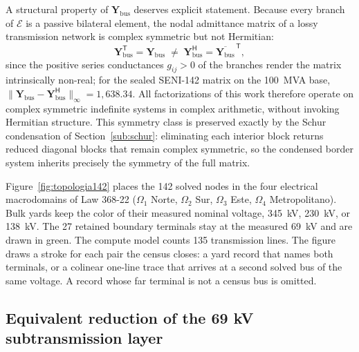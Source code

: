 A structural property of $\mathbf{Y}_{\mathrm{bus}}$ deserves explicit statement. Because every branch of $\mathcal{E}$ is a passive bilateral element, the nodal admittance matrix of a lossy transmission network is complex symmetric but not Hermitian:
\begin{equation}
\mathbf{Y}_{\mathrm{bus}}^{\mathsf{T}} = \mathbf{Y}_{\mathrm{bus}} \;\ne\; \mathbf{Y}_{\mathrm{bus}}^{\mathsf{H}} = \overline{\mathbf{Y}_{\mathrm{bus}}}^{\,\mathsf{T}},
\label{eq:nonhermitian}
\end{equation}
since the positive series conductances $g_{ij} > 0$ of the branches render the matrix intrinsically non-real; for the sealed SENI-142 matrix on the 100~MVA base, $\|\mathbf{Y}_{\mathrm{bus}} - \mathbf{Y}_{\mathrm{bus}}^{\mathsf{H}}\|_{\infty} = 1{,}638.34$. All factorizations of this work therefore operate on complex symmetric indefinite systems in complex arithmetic, without invoking Hermitian structure. This symmetry class is preserved exactly by the Schur condensation of Section~\ref{sub:schur}: eliminating each interior block returns reduced diagonal blocks that remain complex symmetric, so the condensed border system inherits precisely the symmetry of the full matrix.

Figure~\ref{fig:topologia142} places the 142 solved nodes in the four electrical macrodomains of Law 368-22 ($\Omega_1$ Norte, $\Omega_2$ Sur, $\Omega_3$ Este, $\Omega_4$ Metropolitano). Bulk yards keep the color of their measured nominal voltage, 345~kV, 230~kV, or 138~kV. The 27 retained boundary terminals stay at the measured 69~kV and are drawn in green. The compute model counts 135 transmission lines. The figure draws a stroke for each pair the census closes: a yard record that names both terminals, or a colinear one-line trace that arrives at a second solved bus of the same voltage. A record whose far terminal is not a census bus is omitted.




\subsection{Equivalent reduction of the 69 kV subtransmission layer}
\label{sub:reduction}

